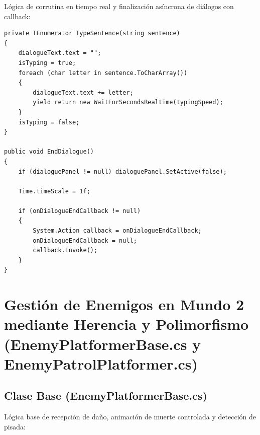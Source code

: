 \clearpage
Lógica de corrutina en tiempo real y finalización asíncrona de diálogos con callback:

\begin{verbatim}
private IEnumerator TypeSentence(string sentence)
{
    dialogueText.text = "";
    isTyping = true;
    foreach (char letter in sentence.ToCharArray())
    {
        dialogueText.text += letter;
        yield return new WaitForSecondsRealtime(typingSpeed); 
    }
    isTyping = false;
}

public void EndDialogue()
{
    if (dialoguePanel != null) dialoguePanel.SetActive(false);

    Time.timeScale = 1f; 

    if (onDialogueEndCallback != null)
    {
        System.Action callback = onDialogueEndCallback;
        onDialogueEndCallback = null;
        callback.Invoke(); 
    }
}
\end{verbatim}

\clearpage
\section{Gestión de Enemigos en Mundo 2 mediante Herencia y Polimorfismo (EnemyPlatformerBase.cs y EnemyPatrolPlatformer.cs)}
\label{ap:sec:enemigos_herencia}

\subsection{Clase Base (EnemyPlatformerBase.cs)}
Lógica base de recepción de daño, animación de muerte controlada y detección de pisada:

